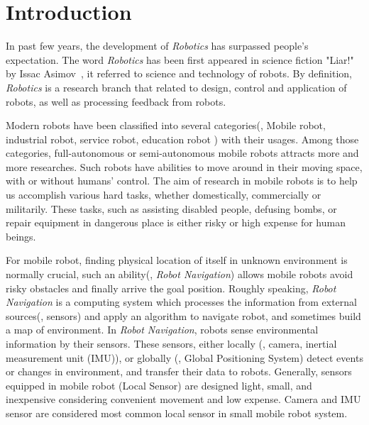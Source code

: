 \chapter{Introduction}
\label{chap:intro}

In past few years, the development of \textit{Robotics} has surpassed people's expectation. The word \textit{Robotics} has been first appeared in science fiction "Liar!" by Issac Asimov~\cite{wiki:Robotics}, it referred to science and technology of robots. By definition, \textit{Robotics} is a research branch that related to design, control and application of robots, as well as processing feedback from robots. 

Modern robots have been classified into several categories(\eg, Mobile robot, industrial robot, service robot, education robot \etc) with their usages. Among those categories, full-autonomous or semi-autonomous mobile robots attracts more and more researches. Such robots have abilities to move around in their moving space, with or without humans' control. The aim of research in mobile robots is to help us accomplish various hard tasks, whether domestically, commercially or militarily. These tasks, such as assisting disabled people, defusing bombs, or repair equipment in dangerous place is either risky or high expense for human beings.    

For mobile robot, finding physical location of itself in unknown environment is normally crucial, such an ability(\eg, \textit{Robot Navigation}) allows mobile robots avoid risky obstacles and finally arrive the goal position. Roughly speaking, \textit{Robot Navigation} is a computing system which processes the information from external sources(\eg, sensors) and apply an algorithm to navigate robot, and sometimes build a map of environment. In \textit{Robot Navigation}, robots sense environmental information by their sensors. These sensors, either locally (\eg, camera, inertial measurement unit (IMU)), or globally (\eg, Global Positioning System) detect events or changes in environment, and transfer their data to robots. Generally, sensors equipped in mobile robot (Local Sensor) are designed light,
small, and inexpensive considering convenient movement and low expense. Camera and IMU sensor are considered most common local sensor in small mobile robot system.

